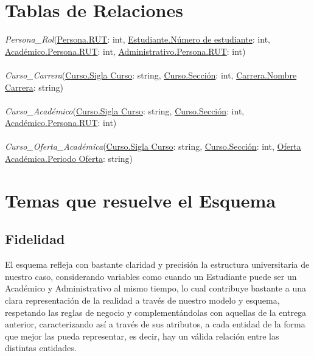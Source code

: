 \documentclass[12pt]{article}
\begin{document}
\section*{Tablas de Relaciones}


\textit{Persona\_Rol}(\underline{Persona.RUT}: int, \underline{Estudiante.Número de estudiante}: int, \underline{Académico.Persona.RUT}: int, \underline{Administrativo.Persona.RUT}: int)\\\\
\textit{Curso\_Carrera}(\underline{Curso.Sigla Curso}: string, \underline{Curso.Sección}: int, \underline{Carrera.Nombre Carrera}: string)\\\\
\textit{Curso\_Académico}(\underline{Curso.Sigla Curso}: string, \underline{Curso.Sección}: int, \underline{Académico.Persona.RUT}: int)\\\\
\textit{Curso\_Oferta\_Académica}(\underline{Curso.Sigla Curso}: string, \underline{Curso.Sección}: int, \underline{Oferta Académica.Periodo Oferta}: string)

\section*{Temas que resuelve el Esquema}
\subsection*{Fidelidad}
El esquema refleja con bastante claridad y precisión la estructura universitaria de nuestro caso, considerando variables como cuando un Estudiante puede ser un Académico y Administrativo al mismo tiempo, lo cual contribuye bastante a una clara representación de la realidad a través de nuestro modelo y esquema, respetando las reglas de negocio y complementándolas con aquellas de la entrega anterior, caracterizando así a través de sus atributos, a cada entidad de la forma que mejor las pueda representar, es decir, hay un válida relación entre las distintas entidades.  
\end{document}
